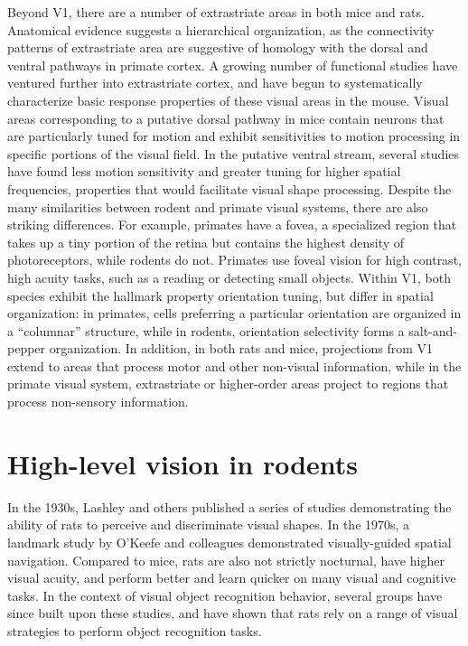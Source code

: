 Beyond V1, there are a number of extrastriate areas in both mice\cite{Andermann2011, Marshel2011, Juavinett2017} and rats\cite{Espinoza1983, Coogan1993}. Anatomical evidence suggests a hierarchical organization\cite{Wang2007, Wang2011}, as the connectivity patterns of extrastriate area are suggestive of homology with the dorsal and ventral pathways in primate cortex. A growing number of functional studies have ventured further into extrastriate cortex, and have begun to systematically characterize basic response properties of these visual areas in the mouse\cite{Andermann2011, Marshel2011, Glickfeld2013, Glickfeld2017, DeVries2020, Siegle2021}. Visual areas corresponding to a putative dorsal pathway in mice contain neurons that are particularly tuned for motion\cite{Andermann2011, Marshel2011, Glickfeld2013} and exhibit sensitivities to motion processing in specific portions of the visual field\cite{Sit2020}. In the putative ventral stream, several studies have found less motion sensitivity and greater tuning for higher spatial frequencies\cite{Glickfeld2013, Tohmi2014}, properties that would facilitate visual shape processing. 
% 
Despite the many similarities between rodent and primate visual systems, there are also striking differences. For example, primates have a fovea, a specialized region that takes up a tiny portion of the retina but contains the highest density of photoreceptors\cite{Perry1985}, while rodents do not. Primates use foveal vision for high contrast, high acuity tasks, such as a reading or detecting small objects. Within V1, both species exhibit the hallmark property orientation tuning, but differ in spatial organization: in primates, cells preferring a particular orientation are organized in a ``columnar'' structure, while in rodents, orientation selectivity forms a salt-and-pepper organization\cite{Ohki2005}. In addition, in both rats and mice, projections from V1 extend to areas that process motor and other non-visual information, while in the primate visual system, extrastriate or higher-order areas project to regions that process non-sensory information. 

\section{High-level vision in rodents}
In the 1930s, Lashley and others published a series of studies demonstrating the ability of rats to perceive and discriminate visual shapes\cite{Lashley1912, Lashley1930a, Lashley1938}. In the 1970s, a landmark study by O'Keefe and colleagues demonstrated visually-guided spatial navigation\cite{OKeefe1971}. Compared to mice, rats are also not strictly nocturnal, have higher visual acuity\cite{Prusky2000}, and perform better and learn quicker on many visual and cognitive tasks\cite{Whishaw1995}. In the context of visual object recognition behavior, several groups have since built upon these studies, and have shown that rats rely on a range of visual strategies to perform object recognition tasks\cite{Zoccolan2009, Tafazoli2012, Vermaercke2012, Alemi-Neissi2013, Vinken2014}.

